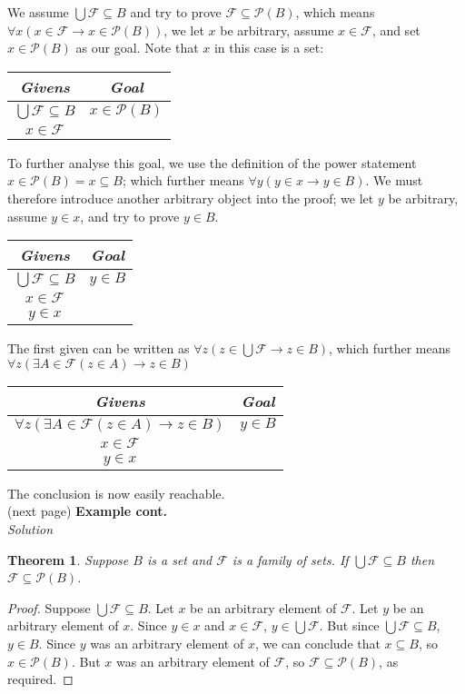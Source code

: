 \documentclass{report}
\newtheorem*{theorem}{Theorem}
\theoremstyle{definition}
\begin{document}
We assume $\bigcup\mathcal F\subseteq B$ and try to prove $\mathcal F\subseteq\mathscr P(B)$, which means $\forall x(x\in\mathcal F\to x\in\mathscr P(B))$, we let $x$ be arbitrary, assume 
$x\in\mathcal F$, and set $x\in\mathscr P(B)$ as our goal. Note that $x$ in this case is a set:
\begin{center}
\begin{tabular}{c|c}
\textit{Givens}&\textit{Goal}\\
\hline
$\bigcup\mathcal F\subseteq B$&$x\in\mathscr P(B)$\\
$x\in\mathcal F$&\\
\end{tabular}
\end{center}
To further analyse this goal, we use the definition of the power statement $x\in\mathscr P(B)=x\subseteq B$; which further means $\forall y(y\in x\to y\in B)$. We must therefore introduce another
arbitrary object into the proof; we let $y$ be arbitrary, assume $y\in x$, and try to prove $y\in B$.
\begin{center}
\begin{tabular}{c|c}
\textit{Givens}&\textit{Goal}\\
\hline
$\bigcup\mathcal F\subseteq B$&$y\in B$\\
$x\in\mathcal F$&\\
$y\in x$&\\
\end{tabular}
\end{center}
The first given can be written as $\forall z(z\in\bigcup\mathcal F\to z\in B)$, which further means
$\forall z(\exists A\in\mathcal F(z\in A)\to z\in B)$
\begin{center}
\begin{tabular}{c|c}
\textit{Givens}&\textit{Goal}\\
\hline
$\forall z(\exists A\in\mathcal F(z\in A)\to z\in B)$&$y\in B$\\
$x\in\mathcal F$&\\
$y\in x$&\\
\end{tabular}
\end{center}
The conclusion is now easily reachable.\\
(next page)\newpage
\noindent\textbf{Example cont.}\\
\textit{Solution}
\begin{theorem}
Suppose $B$ is a set and $\mathcal F$ is a family of sets. If $\bigcup\mathcal F\subseteq B$ then $\mathcal F\subseteq\mathscr P(B)$.
\end{theorem}
\begin{proof}
Suppose $\bigcup\mathcal F\subseteq B$. Let $x$ be an arbitrary element of $\mathcal F$. Let $y$ be an arbitrary element of $x$. Since $y\in x$ and $x\in\mathcal F$, $y\in\bigcup\mathcal F$.
But since $\bigcup\mathcal F\subseteq B$, $y\in B$. Since $y$ was an arbitrary element of $x$, we can conclude that $x\subseteq B$, so $x\in\mathscr P(B)$. But $x$ was an arbitrary element of 
$\mathcal F$, so $\mathcal F\subseteq\mathscr P(B)$, as required.
\end{proof}
\end{document}
